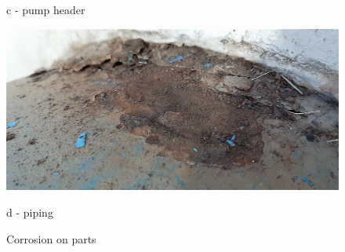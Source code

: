 \begin{figure} [!htb]
\begin{minipage}[b]{0.225\linewidth}
		\caption*{c - pump header}
	\end{minipage}
	\hspace{0.05cm}
	\begin{minipage}[b]{0.225\linewidth}
		\centering
		\includegraphics[width=\textwidth]{figures/fig_ch043_corrosion_4}
		\caption*{d - piping}
	\end{minipage}
\caption{Corrosion on parts}
\label{plant_meters}
\end{figure}